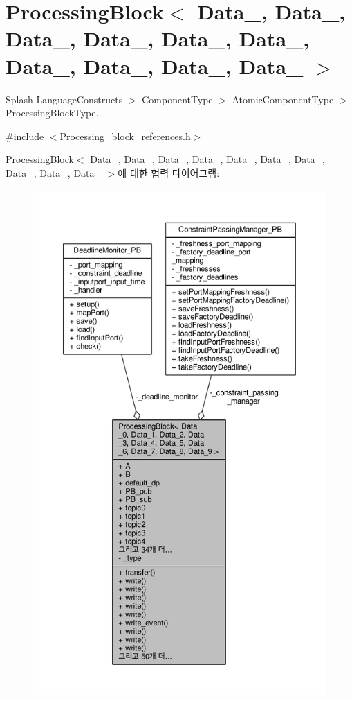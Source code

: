 \hypertarget{classProcessingBlock}{}\section{Processing\+Block$<$ Data\+\_, Data\+\_, Data\+\_, Data\+\_, Data\+\_, Data\+\_, Data\+\_, Data\+\_, Data\+\_, Data\+\_ $>$}
\label{classProcessingBlock}


Splash Language\+Constructs $>$ Component\+Type $>$ Atomic\+Component\+Type $>$ Processing\+Block\+Type.  




{\ttfamily \#include $<$Processing\+\_\+block\+\_\+references.\+h$>$}



Processing\+Block$<$ Data\+\_, Data\+\_, Data\+\_, Data\+\_, Data\+\_, Data\+\_, Data\+\_, Data\+\_, Data\+\_, Data\+\_ $>$에 대한 협력 다이어그램\+:\nopagebreak
\begin{figure}[H]
\begin{center}
\leavevmode
\includegraphics[height=550pt]{classProcessingBlock__coll__graph}
\end{center}
\end{figure}
